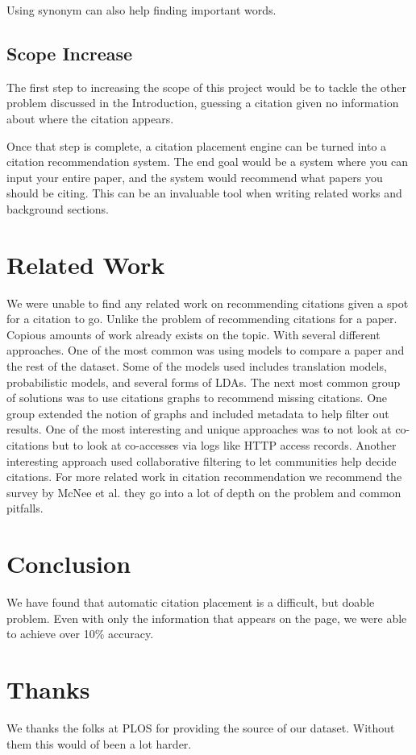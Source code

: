 \documentclass[10pt, conference, compsocconf]{IEEEtran}
\begin{document}
Using synonym can also help finding important words.

\subsection{Scope Increase}
The first step to increasing the scope of this project would be to tackle the other problem discussed in the Introduction,
guessing a citation given no information about where the citation appears.

Once that step is complete, a citation placement engine can be turned into a citation recommendation system.
The end goal would be a system where you can input your entire paper, and the system would recommend what papers
you should be citing. This can be an invaluable tool when writing related works and background sections.

\section{Related Work}\label{sec:related}
We were unable to find any related work on recommending citations given a spot for a citation to go. Unlike the problem of recommending citations for a paper. Copious amounts of work already exists on the topic. With several different approaches. One of the most common was using models to compare a paper and the rest of the dataset. Some of the models used includes translation models, probabilistic models, and several forms of LDAs.\cite{cite1, cite2, cite3} The next most common group of solutions was to use citations graphs to recommend missing citations.\cite{cite6} One group extended the notion of graphs and included metadata to help filter out results.\cite{cite4} One of the most 
interesting and unique approaches was to not look at co-citations but to look at co-accesses via logs like HTTP access records.\cite{cite7}
Another interesting approach used collaborative filtering to let communities help decide citations.\cite{cite8} For more related work in
citation recommendation we recommend the survey by McNee et al. they go into a lot of depth on the problem and common pitfalls.\cite{cite5}

\section{Conclusion}\label{sec:conclusion}
We have found that automatic citation placement is a difficult, but doable problem.
Even with only the information that appears on the page, we were able to achieve over 10\% accuracy.

\section{Thanks}
We thanks the folks at PLOS for providing the source of our dataset. Without them this would of been a lot harder.



\end{document}
